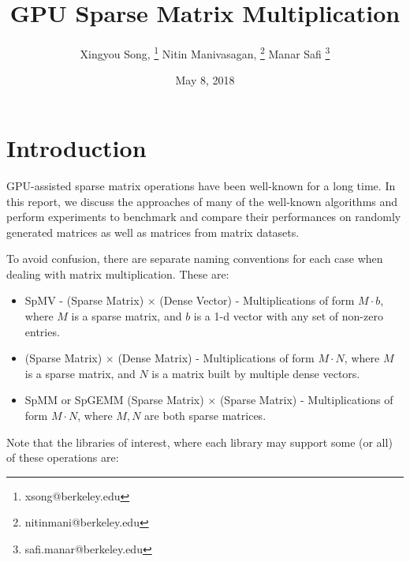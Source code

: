 \documentclass[12pt]{article}
\begin{document}
\nocite{*} 
 

\title{GPU Sparse Matrix Multiplication}
\author{Xingyou Song, \footnote{xsong@berkeley.edu} Nitin Manivasagan, \footnote{nitinmani@berkeley.edu} Manar Safi \footnote{safi.manar@berkeley.edu}}
\date{May 8, 2018} 
\maketitle

\section{Introduction}

\hspace{0.5cm}GPU-assisted sparse matrix operations have been well-known for a long time. In this report, we discuss the approaches of many of the well-known algorithms and perform experiments to benchmark and compare their performances on randomly generated matrices as well as matrices from matrix datasets.

To avoid confusion, there are separate naming conventions for each case when dealing with matrix multiplication. These are: 
\begin{itemize}
\item SpMV - (Sparse Matrix) $\times$ (Dense Vector) - Multiplications of form $M \cdot b$, where $M$ is a sparse matrix, and $b$ is a 1-d vector with any set of non-zero entries.
\item (Sparse Matrix) $\times$ (Dense Matrix) - Multiplications of form $M \cdot N$, where $M$ is a sparse matrix, and $N$ is a matrix built by multiple dense vectors. 
\item SpMM or SpGEMM (Sparse Matrix) $\times$ (Sparse Matrix) - Multiplications of form $M \cdot N$, where $M,N$ are both sparse matrices. 
\end{itemize}

Note that the libraries of interest, where each library may support some (or all) of these operations are:
\end{document}
